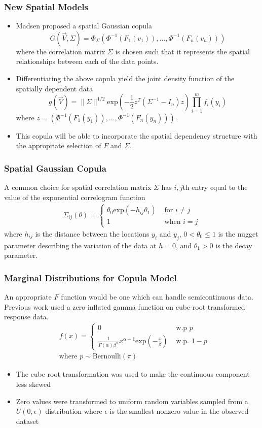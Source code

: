 \documentclass{beamer}
\begin{document}
\begin{frame}
	\frametitle{New Spatial Models}
	\begin{itemize}
	\item Madsen\cite{madsen09} proposed a spatial Gaussian copula
	$$
	G(\vec{V}, \Sigma) = \Phi_{\Sigma}(\Phi^{-1}(F_1(v_1)), \ldots, \Phi^{-1}(F_n(v_n)))
	$$
	where the correlation matrix $\Sigma$ is chosen such that it represents the spatial relationships between each of the data points.
	\item Differentiating the above copula yield the joint density function of the spatially dependent data
	$$
	g(\vec{V}) = \| \Sigma \|^{1/2} \text{exp}\left(-\frac{1}{2} z^T (\Sigma^{-1} - I_n) z\right) \prod_{i = 1}^m f_i(y_i)
	$$
where $z = (\Phi^{-1}(F_1(y_1)), \ldots, \Phi^{-1}(F_n(y_n)))$.
	\item This copula will be able to incorporate the spatial dependency structure with the appropriate selection of $F$ and $\Sigma$.
	\end{itemize}
\end{frame}

\begin{frame}
	\frametitle{Spatial Gaussian Copula}
	A common choice for spatial correlation matrix $\Sigma$ has $i,j$th entry equal to the value of the exponential correlogram function
	\begin{align*}
	\Sigma_{ij}(\theta) = 
		\begin{cases}
			\theta_0 \text{exp}(-h_{ij} \theta_1) & \text{ for } i \neq j\\
			1 & \text{ when } i = j
		\end{cases}
	\end{align*}
where $h_{ij}$ is the distance between the locations $y_i$ and $y_j$, $0 < \theta_0 \leq 1$ is the nugget parameter describing the variation of the data at $h = 0$, and $\theta_1 > 0$ is the decay parameter.
\end{frame}

\begin{frame}
	\frametitle{Marginal Distributions for Copula Model}
	An appropriate $F$ function would be one which can handle semicontinuous data.
	Previous work used a zero-inflated gamma function on cube-root transformed response data.
	\begin{align*}
	&f(x) = 
	\begin{cases}
		0 & \text{ w.p } p \\
		\frac{1}{\Gamma(\alpha) \beta^\alpha} x^{\alpha -1} \text{exp}\left(-\frac{x}{\beta}\right) & \text{ w.p. } 1 - p 
	\end{cases} 
	\\
	&\text{where } p \sim \text{Bernoulli}(\pi)
	\end{align*}
	\begin{itemize}
	\item The cube root transformation was used to make the continuous component less skewed
	\item Zero values were transformed to uniform random variables sampled from a $U(0, \epsilon)$ distribution where $\epsilon$ is the smallest nonzero value in the observed dataset
	\end{itemize}
\end{frame}
\end{document}

